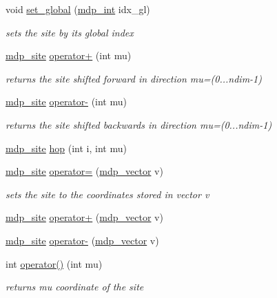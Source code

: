 \begin{DoxyCompactItemize}
void \hyperlink{classmdp__site_ad0b34065c28aa0abaaf5b742b459bc77}{set\+\_\+global} (\hyperlink{mdp__global__vars_8h_aaa1ad9d0dcd2124aa5af0120d9954174}{mdp\+\_\+int} idx\+\_\+gl)
\begin{DoxyCompactList}\small\item\em sets the site by its global index \end{DoxyCompactList}\item 
\hyperlink{classmdp__site}{mdp\+\_\+site} \hyperlink{classmdp__site_a86993407e982dc5dbc92cca7dfdaa536}{operator+} (int mu)
\begin{DoxyCompactList}\small\item\em returns the site shifted forward in direction mu=(0...ndim-\/1) \end{DoxyCompactList}\item 
\hyperlink{classmdp__site}{mdp\+\_\+site} \hyperlink{classmdp__site_a3dceebe7dec6a488314064cee7ef8d80}{operator-\/} (int mu)
\begin{DoxyCompactList}\small\item\em returns the site shifted backwards in direction mu=(0...ndim-\/1) \end{DoxyCompactList}\item 
\hyperlink{classmdp__site}{mdp\+\_\+site} \hyperlink{classmdp__site_a5982cae4c0bf2c255a978529dc6afe6c}{hop} (int i, int mu)
\item 
\hyperlink{classmdp__site}{mdp\+\_\+site} \hyperlink{classmdp__site_aa4931841d551417b526a2d2d22751471}{operator=} (\hyperlink{classmdp__vector}{mdp\+\_\+vector} v)
\begin{DoxyCompactList}\small\item\em sets the site to the coordinates stored in vector v \end{DoxyCompactList}\item 
\hyperlink{classmdp__site}{mdp\+\_\+site} \hyperlink{classmdp__site_a5fc9e1550603644416108c92cbf3cab8}{operator+} (\hyperlink{classmdp__vector}{mdp\+\_\+vector} v)
\item 
\hyperlink{classmdp__site}{mdp\+\_\+site} \hyperlink{classmdp__site_a20d26e5db480233e64bde96eb67180fc}{operator-\/} (\hyperlink{classmdp__vector}{mdp\+\_\+vector} v)
\item 
int \hyperlink{classmdp__site_abbbb7f94657ed5112919578d63a3272c}{operator()} (int mu)
\begin{DoxyCompactList}\small\item\em returns mu coordinate of the site \end{DoxyCompactList}\item 

\end{DoxyCompactItemize}
